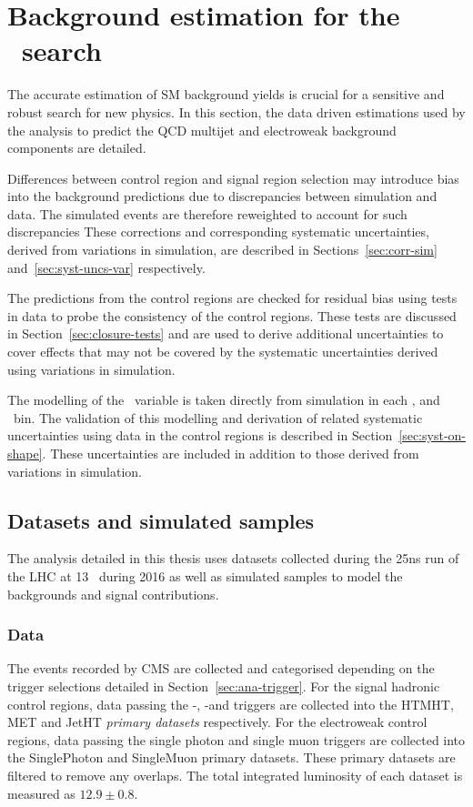 \chapter{Background estimation for the \alphat~search}
\label{cha:backgroundPrediction}

The accurate estimation of SM background yields is crucial for a sensitive and robust
search for new physics. In this section, the data driven estimations used by
the \alphat analysis to predict the QCD multijet and electroweak 
background components are detailed. 

Differences between control region and signal 
region selection may introduce bias into the background predictions
due to discrepancies between simulation and data. 
The simulated events are therefore reweighted to account for such discrepancies
These corrections and corresponding systematic uncertainties, derived
from variations in simulation, are described in Sections~\ref{sec:corr-sim} 
and~\ref{sec:syst-uncs-var} respectively.  

The predictions from the control regions are checked for residual bias 
using tests in data to probe the consistency of the control regions. 
These tests are discussed in Section~\ref{sec:closure-tests} and 
are used to derive additional uncertainties to cover effects 
that may not be covered by the systematic uncertainties derived 
using variations in simulation.

The modelling of the \mht~variable is taken directly from simulation in each \nj, \nb
and \scalht~bin. The validation of this modelling 
and derivation of related systematic uncertainties using data in the 
control regions is described in Section~\ref{sec:syst-on-shape}. These uncertainties 
are included in addition to those derived from variations in simulation.

\section{Datasets and simulated samples}

The analysis detailed in this thesis uses datasets collected during the 25ns run of the 
LHC at 13 \TeV~during 2016 as well as simulated samples to model the backgrounds and
signal contributions.

\subsection{Data}
The events recorded by CMS are collected and categorised depending on the trigger selections
detailed in Section~\ref{sec:ana-trigger}. For the signal hadronic control regions, data passing the \alphat-\scalht,
\mht-\met and \scalht triggers are collected into the HTMHT, MET and JetHT \emph{primary datasets} respectively.
For the electroweak control regions, data passing the single photon and single muon triggers are collected 
into the SinglePhoton and SingleMuon primary datasets. These primary datasets are filtered to remove
any overlaps. The total integrated luminosity of each dataset is measured as $12.9\pm0.8$\ifb.

